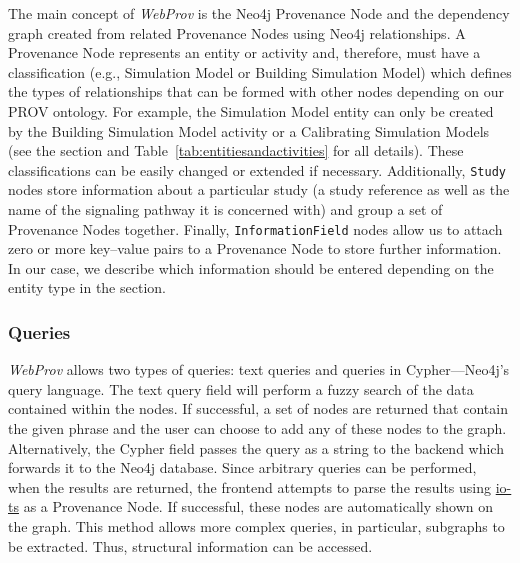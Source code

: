 \documentclass[10pt,letterpaper]{article}
\newcommand{\webprov}{\textit{WebProv}}
\newcommand{\provnode}{Provenance Node}
\newcommand{\provnodes}{Provenance Nodes}
\newcommand{\SM}{Simulation Model}
\newcommand{\BSM}{Building Simulation Model}
\newcommand{\CSM}{Calibrating Simulation Model}
\begin{document}
The main concept of \webprov{} is the Neo4j \provnode{} and the dependency graph created from related \provnodes{} using Neo4j relationships.
A \provnode{} represents an entity or activity and, therefore, must have a classification (e.g., \SM{} or \BSM{}) which defines the types of relationships that can be formed with other nodes depending on our PROV ontology.
For example, the \SM{} entity can only be created by the \BSM{} activity or a \CSM{}s (see the  section and Table~\ref{tab:entitiesandactivities} for all details).
These classifications can be easily changed or extended if necessary.
Additionally, \texttt{Study} nodes store information about a particular study (a study reference as well as the name of the signaling pathway it is concerned with) and group a set of \provnodes{} together.
Finally, \texttt{InformationField} nodes allow us to attach zero or more key--value pairs to a \provnode{} to store further information.
In our case, we describe which information should be entered depending on the entity type in the  section.



\subsubsection*{Queries}

\webprov{} allows two types of queries: text queries and queries in Cypher---Neo4j's query language.
The text query field will perform a fuzzy search of the data contained within the nodes.
If successful, a set of nodes are returned that contain the given phrase and the user can choose to add any of these nodes to the graph.
Alternatively, the Cypher field passes the query as a string to the backend which forwards it to the Neo4j database.
Since arbitrary queries can be performed, when the results are returned, the frontend attempts to parse the results using \href{https://github.com/gcanti/io-ts}{io-ts} as a \provnode{}.
If successful, these nodes are automatically shown on the graph.
This method allows more complex queries, in particular, subgraphs to be extracted.
Thus, structural information can be accessed.



\end{document}
